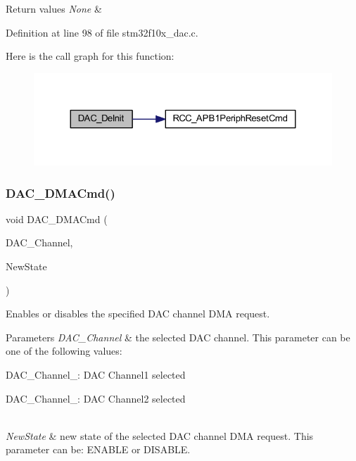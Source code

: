 \begin{DoxyRetVals}{Return values}
{\em None} & \\
\hline
\end{DoxyRetVals}


Definition at line 98 of file stm32f10x\+\_\+dac.\+c.

Here is the call graph for this function\+:
\nopagebreak
\begin{figure}[H]
\begin{center}
\leavevmode
\includegraphics[width=324pt]{group___d_a_c___exported___functions_ga1fae225204e1e049d6795319e99ba8bc_cgraph}
\end{center}
\end{figure}
\mbox{\label{group___d_a_c___exported___functions_ga194cba38f60ace11658824f0250121f4}} 
\subsubsection{\texorpdfstring{D\+A\+C\+\_\+\+D\+M\+A\+Cmd()}{DAC\_DMACmd()}}
{\footnotesize\ttfamily void D\+A\+C\+\_\+\+D\+M\+A\+Cmd (\begin{DoxyParamCaption}\item[{uint32\+\_\+t}]{D\+A\+C\+\_\+\+Channel,  }\item[{\hyperlink{group___exported__types_gac9a7e9a35d2513ec15c3b537aaa4fba1}{Functional\+State}}]{New\+State }\end{DoxyParamCaption})}



Enables or disables the specified D\+AC channel D\+MA request. 


\begin{DoxyParams}{Parameters}
{\em D\+A\+C\+\_\+\+Channel} & the selected D\+AC channel. This parameter can be one of the following values\+: \begin{DoxyItemize}
\item D\+A\+C\+\_\+\+Channel\+\_\+: D\+AC Channel1 selected \item D\+A\+C\+\_\+\+Channel\+\_\+: D\+AC Channel2 selected \end{DoxyItemize}
\\
\hline
{\em New\+State} & new state of the selected D\+AC channel D\+MA request. This parameter can be\+: E\+N\+A\+B\+LE or D\+I\+S\+A\+B\+LE. \\
\hline
\end{DoxyParams}

